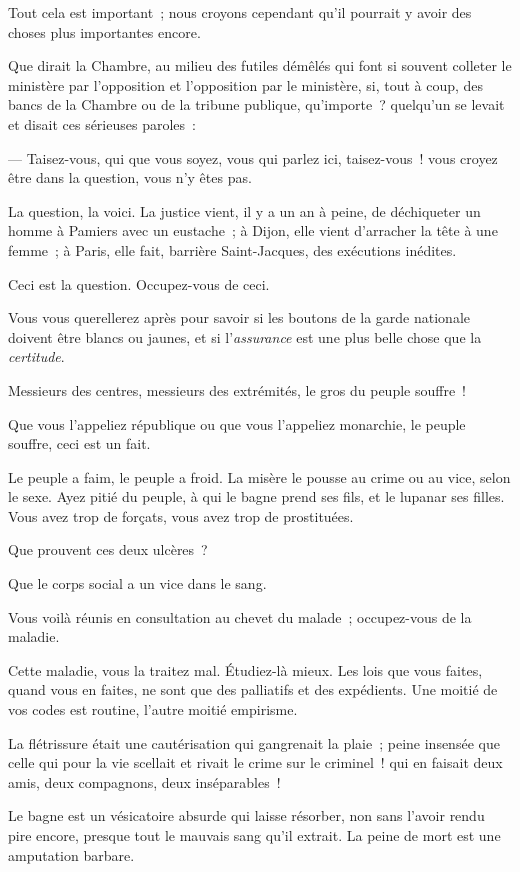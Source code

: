 \documentclass[french,twoside]{book} %
\begin{document}
Tout cela est important ; nous croyons cependant qu’il pourrait y avoir des choses plus importantes encore.\par
Que dirait la Chambre, au milieu des futiles démêlés qui font si souvent colleter le ministère par l’opposition et l’opposition par le ministère, si, tout à coup, des bancs de la Chambre ou de la tribune publique, qu’importe ? quelqu’un se levait et disait ces sérieuses paroles :\par
— Taisez-vous, qui que vous soyez, vous qui parlez ici, taisez-vous ! vous croyez être dans la question, vous n’y êtes pas.\par
La question, la voici. La justice vient, il y a un an à peine, de déchiqueter un homme à Pamiers avec un eustache ; à Dijon, elle vient d’arracher la tête à une femme ; à Paris, elle fait, barrière Saint-Jacques, des exécutions inédites.\par
Ceci est la question. Occupez-vous de ceci.\par
Vous vous querellerez après pour savoir si les boutons de la garde nationale doivent être blancs ou jaunes, et si l’\emph{assurance} est une plus belle chose que la \emph{certitude}.\par
Messieurs des centres, messieurs des extrémités, le gros du peuple souffre !\par
Que vous l’appeliez république ou que vous l’appeliez monarchie, le peuple souffre, ceci est un fait.\par
 Le peuple a faim, le peuple a froid. La misère le pousse au crime ou au vice, selon le sexe. Ayez pitié du peuple, à qui le bagne prend ses fils, et le lupanar ses filles. Vous avez trop de forçats, vous avez trop de prostituées.\par
Que prouvent ces deux ulcères ?\par
Que le corps social a un vice dans le sang.\par
Vous voilà réunis en consultation au chevet du malade ; occupez-vous de la maladie.\par
Cette maladie, vous la traitez mal. Étudiez-là mieux. Les lois que vous faites, quand vous en faites, ne sont que des palliatifs et des expédients. Une moitié de vos codes est routine, l’autre moitié empirisme.\par
La flétrissure était une cautérisation qui gangrenait la plaie ; peine insensée que celle qui pour la vie scellait et rivait le crime sur le criminel ! qui en faisait deux amis, deux compagnons, deux inséparables !\par
Le bagne est un vésicatoire absurde qui laisse résorber, non sans l’avoir rendu pire encore, presque tout le mauvais sang qu’il extrait. La peine de mort est une amputation barbare.\par
\end{document}
